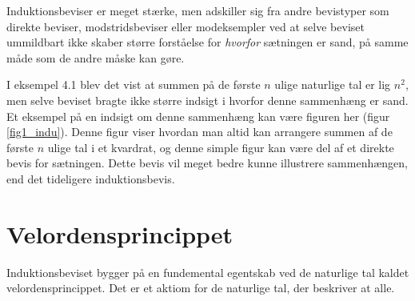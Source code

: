 Induktionsbeviser er meget stærke, men adskiller sig fra andre bevistyper som direkte beviser, modstridsbeviser eller modeksempler ved at selve beviset ummildbart ikke skaber større forståelse for \textit{hvorfor} sætningen er sand, på samme måde som de andre måske kan gøre.

I eksempel 4.1 blev det vist at summen på de første $n$ ulige naturlige tal er lig $n^2$, men selve beviset bragte ikke større indsigt i hvorfor denne sammenhæng er sand.
Et eksempel på en indsigt om denne sammenhæng kan være figuren her (figur \ref{fig1_indu}).
Denne figur viser hvordan man altid kan arrangere summen af de første $n$ ulige tal i et kvardrat, og denne simple figur kan være del af et direkte bevis for sætningen.
Dette bevis vil meget bedre kunne illustrere sammenhængen, end det tideligere induktionsbevis.

\section{Velordensprincippet}
Induktionsbeviset bygger på en fundemental egentskab ved de naturlige tal kaldet velordensprincippet.
Det er et aktiom for de naturlige tal, der beskriver at alle.

